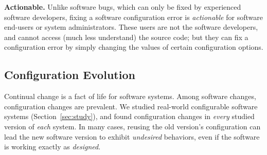 \textbf{Actionable.}
Unlike software bugs,
which can only be fixed by experienced software developers, fixing a software
configuration error is \textit{actionable} for software end-users
or system administrators. These users are not the software developers,
and cannot access (much less understand)
the source code;  but they can fix a configuration error by simply changing
the values of certain configuration options.


\subsection{Configuration Evolution}
\label{sec:evolerror}

Continual change is a fact of life for software systems.
Among software changes, configuration changes are prevalent.
We studied \studysubjnum real-world configurable software
systems (Section~\ref{sec:study}), and
found configuration changes in \textit{every} studied
version of \textit{each} system. In many 
cases, reusing the old version's configuration
can lead the new software version
to exhibit \textit{undesired} behaviors,
even if the software is working exactly as \textit{designed}.






